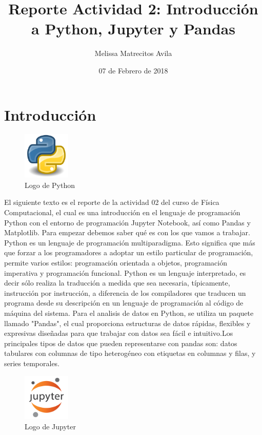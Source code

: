 \documentclass{article} %
\title{Reporte Actividad 2: Introducción a Python, Jupyter y Pandas}
\author{Melissa Matrecitos Avila}
\date{07 de Febrero de 2018}
\begin{document}
\maketitle
\section{Introducción}

\begin{figure}
  \centering
  \includegraphics[width=0.2\textwidth]{Python.png}
  \caption{Logo de Python}
  \label{fig:Logo}
\end{figure}

El siguiente texto es el reporte de la actividad 02 del curso de Física Computacional, el cual es una introducción en el lenguaje de programación Python con el entorno de programación Jupyter Notebook, así como Pandas y Matplotlib. Para empezar debemos saber qué es con los que vamos a trabajar.
Python es un lenguaje de programación multiparadigma. Esto significa que más que forzar a los programadores a adoptar un estilo particular de programación, permite varios estilos: programación orientada a objetos, programación imperativa y programación funcional. Python es un lenguaje interpretado, es decir sólo realiza la traducción a medida que sea necesaria, típicamente, instrucción por instrucción, a diferencia de los compiladores que traducen un programa desde su descripción en un lenguaje de programación al código de máquina del sistema. Para el analisis de datos en Python, se utiliza un paquete llamado "Pandas", el cual proporciona estructuras de datos rápidas, flexibles y expresivas diseñadas para que trabajar con datos sea fácil e intuitivo.Los principales tipos de datos que pueden representarse con pandas son: datos tabulares con columnas de tipo heterogéneo con etiquetas en columnas y filas, y series temporales.

\begin{figure}
  \centering
  \includegraphics[width=0.2\textwidth]{Jupyter.png}
  \caption{Logo de Jupyter}
  \label{fig:Logo}
\end{figure}
\end{document}
